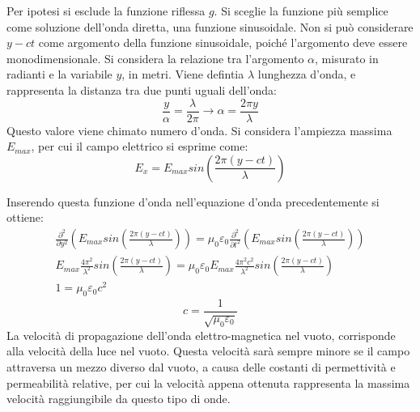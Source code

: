 \documentclass{article}
\numberwithin{equation}{subsection}
\begin{document}
Per ipotesi si esclude la funzione riflessa $g$. Si sceglie la funzione più semplice come soluzione dell'onda diretta, una funzione sinusoidale. Non si può considerare $y-ct$ 
come argomento della funzione sinusoidale, poiché l'argomento deve essere monodimensionale. Si considera la relazione tra l'argomento $\alpha$, misurato in radianti e la 
variabile $y$, in metri. Viene defintia $\lambda$ lunghezza d'onda, e rappresenta la distanza tra due punti uguali dell'onda: 
\begin{equation*}
    \displaystyle\frac{y}{\alpha}=\frac{\lambda}{2\pi}\to\alpha=\frac{2\pi y}{\lambda}
\end{equation*}
Questo valore viene chimato numero d'onda. Si considera l'ampiezza massima $E_{max}$, per cui il campo elettrico si esprime come:
\begin{equation}
    E_x=E_{max}sin\left(\displaystyle\frac{2\pi (y-ct)}{\lambda}\right)
\end{equation}

Inserendo questa funzione d'onda nell'equazione d'onda precedentemente si ottiene:
\begin{gather*}
    \displaystyle\frac{\partial^2}{\partial y^2}\left(E_{max}sin\left(\displaystyle\frac{2\pi (y-ct)}{\lambda}\right)\right)=\mu_0\varepsilon_0\frac{\partial^2}{\partial t^2}\left(E_{max}sin\left(\displaystyle\frac{2\pi (y-ct)}{\lambda}\right)\right)\\
    \displaystyle E_{max}\frac{4\pi^2}{\lambda^2}sin\left(\frac{2\pi (y-ct)}{\lambda}\right)=\mu_0\varepsilon_0E_{max}\frac{4\pi^2c^2}{\lambda^2}sin\left(\frac{2\pi (y-ct)}{\lambda}\right)\\
    1=\mu_0\varepsilon_0c^2
\end{gather*}
\begin{equation}
    c=\displaystyle\frac{1}{\sqrt{\mu_0\varepsilon_0}}
\end{equation}
La velocità di propagazione dell'onda elettro-magnetica nel vuoto, corrisponde alla velocità della luce nel vuoto. Questa velocità sarà sempre minore se il campo attraversa 
un mezzo diverso dal vuoto, a causa delle costanti di permettività e permeabilità relative, per cui la velocità appena ottenuta rappresenta la massima velocità raggiungibile 
da questo tipo di onde. 

\begin{center}
\end{center}
\end{document}
